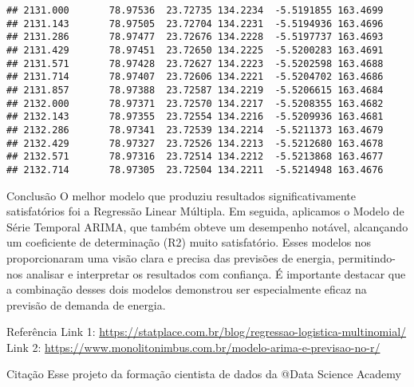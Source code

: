 \documentclass[
]{article}
\begin{document}
\begin{verbatim}
## 2131.000       78.97536  23.72735 134.2234  -5.5191855 163.4699
## 2131.143       78.97505  23.72704 134.2231  -5.5194936 163.4696
## 2131.286       78.97477  23.72676 134.2228  -5.5197737 163.4693
## 2131.429       78.97451  23.72650 134.2225  -5.5200283 163.4691
## 2131.571       78.97428  23.72627 134.2223  -5.5202598 163.4688
## 2131.714       78.97407  23.72606 134.2221  -5.5204702 163.4686
## 2131.857       78.97388  23.72587 134.2219  -5.5206615 163.4684
## 2132.000       78.97371  23.72570 134.2217  -5.5208355 163.4682
## 2132.143       78.97355  23.72554 134.2216  -5.5209936 163.4681
## 2132.286       78.97341  23.72539 134.2214  -5.5211373 163.4679
## 2132.429       78.97327  23.72526 134.2213  -5.5212680 163.4678
## 2132.571       78.97316  23.72514 134.2212  -5.5213868 163.4677
## 2132.714       78.97305  23.72504 134.2211  -5.5214948 163.4676
\end{verbatim}

Conclusão O melhor modelo que produziu resultados significativamente
satisfatórios foi a Regressão Linear Múltipla. Em seguida, aplicamos o
Modelo de Série Temporal ARIMA, que também obteve um desempenho notável,
alcançando um coeficiente de determinação (R2) muito satisfatório. Esses
modelos nos proporcionaram uma visão clara e precisa das previsões de
energia, permitindo-nos analisar e interpretar os resultados com
confiança. É importante destacar que a combinação desses dois modelos
demonstrou ser especialmente eficaz na previsão de demanda de energia.

Referência Link 1:
\url{https://statplace.com.br/blog/regressao-logistica-multinomial/}
Link 2:
\url{https://www.monolitonimbus.com.br/modelo-arima-e-previsao-no-r/}

Citação Esse projeto da formação cientista de dados da @Data Science
Academy
\end{document}
